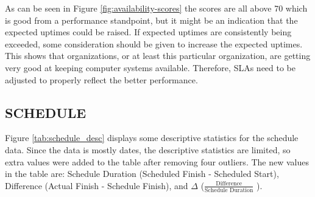\documentclass[SDSUThesis.tex]{subfiles}
\begin{document}
        As can be seen in Figure  \ref{fig:availability-scores}
        the scores are all above 70 which
        is good from a performance standpoint, but it might be an
        indication that the expected uptimes could be raised.  If expected
        uptimes are consistently being exceeded, some consideration should
        be given to increase the expected uptimes.  This shows that
        organizations, or at least this particular organization, are getting
        very good at keeping computer systems available.  Therefore,
        SLAs need to be adjusted to properly reflect the better performance.
        
        
    \subsection{SCHEDULE}
        Figure \ref{tab:schedule_desc} displays some descriptive statistics
        for the schedule data.  Since the data is mostly dates, the 
        descriptive statistics are limited, so extra values were
        added to the table after removing four outliers.  The new values
        in the table are: Schedule Duration (Scheduled Finish - Scheduled Start),
        Difference (Actual Finish - Schedule Finish), and 
        $\Delta$ ($\frac{\text{Difference}}{\text{Schedule Duration}}$ ).
    
\end{document}
